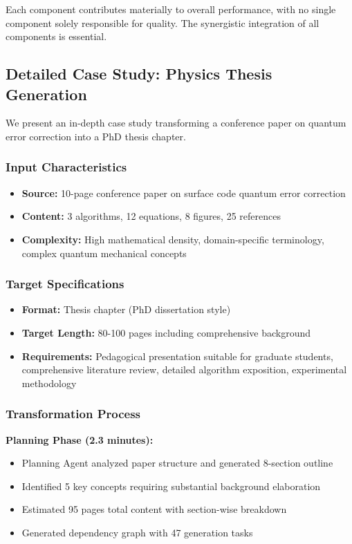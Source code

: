 \documentclass{ieeeaccess}
\begin{document}
Each component contributes materially to overall performance, with no single component solely responsible for quality. The synergistic integration of all components is essential.

\subsection{Detailed Case Study: Physics Thesis Generation}

We present an in-depth case study transforming a conference paper on quantum error correction into a PhD thesis chapter.

\subsubsection{Input Characteristics}

\begin{itemize}
\item \textbf{Source:} 10-page conference paper on surface code quantum error correction
\item \textbf{Content:} 3 algorithms, 12 equations, 8 figures, 25 references
\item \textbf{Complexity:} High mathematical density, domain-specific terminology, complex quantum mechanical concepts
\end{itemize}

\subsubsection{Target Specifications}

\begin{itemize}
\item \textbf{Format:} Thesis chapter (PhD dissertation style)
\item \textbf{Target Length:} 80-100 pages including comprehensive background
\item \textbf{Requirements:} Pedagogical presentation suitable for graduate students, comprehensive literature review, detailed algorithm exposition, experimental methodology
\end{itemize}

\subsubsection{Transformation Process}

\textbf{Planning Phase (2.3 minutes):}
\begin{itemize}
\item Planning Agent analyzed paper structure and generated 8-section outline
\item Identified 5 key concepts requiring substantial background elaboration
\item Estimated 95 pages total content with section-wise breakdown
\item Generated dependency graph with 47 generation tasks
\end{itemize}
\end{document}
